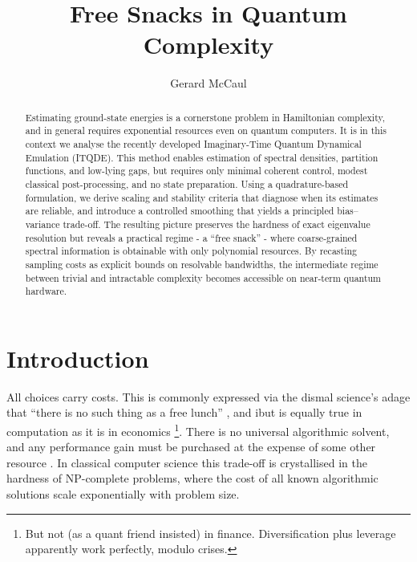 \documentclass[reprint, aps,prx,showpacs,bibfootnote,preprintnumbers, mathtools, superscriptaddress, amsmath,amssymb]{revtex4-2}
\begin{document}
\title{Free Snacks in Quantum Complexity}

\begin{abstract}
Estimating ground-state energies is a cornerstone problem in Hamiltonian complexity, and in general requires exponential resources even on quantum computers. It is in this context we analyse the recently developed Imaginary-Time Quantum Dynamical Emulation (ITQDE)\cite{leamer_quantum_2024}. This method enables estimation of spectral densities, partition functions, and low-lying gaps, but requires only minimal coherent control, modest classical post-processing, and no state preparation. Using a quadrature-based formulation, we derive scaling and stability criteria that diagnose when its estimates are reliable, and introduce a controlled smoothing that yields a principled bias–variance trade-off. The resulting picture preserves the hardness of exact eigenvalue resolution but reveals a practical regime - a “free snack” -  where coarse-grained spectral information is obtainable with only polynomial resources. By recasting sampling costs as explicit bounds on resolvable bandwidths, the intermediate regime between trivial and intractable complexity becomes accessible on near-term quantum hardware.
\end{abstract}


\author{Gerard McCaul}




\maketitle

\section{Introduction}
All choices carry costs. This is commonly expressed via the dismal science's adage that “there is no such thing as a free lunch” \cite{friedman1975:free_lunch,ade2016:free_lunch}, and ibut is equally true in computation as it is in economics \footnote{But not (as a quant friend insisted) in finance. Diversification plus leverage apparently work perfectly, modulo crises.}. There is no universal algorithmic solvent, and any performance gain must be purchased at the expense of some other resource \cite{wolpert_no_1997}.  In classical computer science this trade-off is crystallised in the hardness of NP-complete problems, where the cost of all known algorithmic solutions scale exponentially with problem size.
\end{document}
